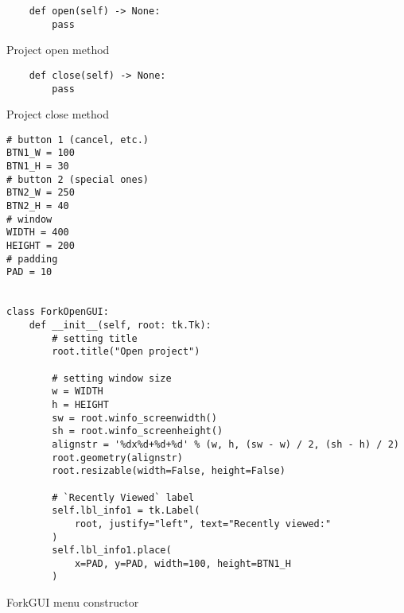 \newpage
\begin{listing}[!h]
    \begin{verbatim}
    def open(self) -> None:
        pass
    \end{verbatim}
    \caption{Project open method}
    \label{sc:project-open-method}
\end{listing}

\newpage
\begin{listing}[!h]
    \begin{verbatim}
    def close(self) -> None:
        pass
    \end{verbatim}
    \caption{Project close method}
    \label{sc:project-close-method}
\end{listing}



\newpage
\begin{listing}[!ht]
    \begin{verbatim}
# button 1 (cancel, etc.)
BTN1_W = 100
BTN1_H = 30
# button 2 (special ones)
BTN2_W = 250
BTN2_H = 40
# window
WIDTH = 400
HEIGHT = 200
# padding
PAD = 10


class ForkOpenGUI:
    def __init__(self, root: tk.Tk):
        # setting title
        root.title("Open project")

        # setting window size
        w = WIDTH
        h = HEIGHT
        sw = root.winfo_screenwidth()
        sh = root.winfo_screenheight()
        alignstr = '%dx%d+%d+%d' % (w, h, (sw - w) / 2, (sh - h) / 2)
        root.geometry(alignstr)
        root.resizable(width=False, height=False)
        
        # `Recently Viewed` label
        self.lbl_info1 = tk.Label(
            root, justify="left", text="Recently viewed:"
        )
        self.lbl_info1.place(
            x=PAD, y=PAD, width=100, height=BTN1_H
        )
    \end{verbatim}
    \caption{ForkGUI menu constructor}
    \label{sc:fork-gui-constructor}
\end{listing}

